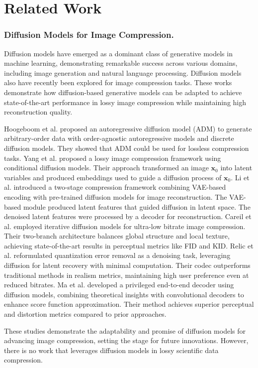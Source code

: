 \section{Related Work}

\subsubsection{Diffusion Models for Image Compression.}

Diffusion models \cite{Sohl2015,Song2019,Ho2020,Song2021scorebased,Nichol2021,Dhariwal2021,yu2024pet} have emerged as a dominant class of generative models in machine learning, demonstrating remarkable success across various domains, including image generation and natural language processing. Diffusion models also have recently been explored for image compression tasks. These works demonstrate how diffusion-based generative models can be adapted to achieve state-of-the-art performance in lossy image compression while maintaining high reconstruction quality.

Hoogeboom et al. proposed an autoregressive diffusion model (ADM) \cite{Hoogeboom2022autoregressive} to generate arbitrary-order data with order-agnostic autoregressive models and discrete diffusion models. They showed that ADM could be used for lossless compression tasks. Yang et al. \cite{Yang2023cd} proposed a lossy image compression framework using conditional diffusion models. Their approach transformed an image $\boldsymbol{x}_0$ into latent variables and produced embeddings used to guide a diffusion process of $\boldsymbol{x}_0$. Li et al. \cite{Li2024extreme} introduced a two-stage compression framework combining VAE-based encoding with pre-trained diffusion models for image reconstruction. The VAE-based module produced latent features that guided diffusion in latent space. The denoised latent features were processed by a decoder for reconstruction. Careil et al. \cite{Careil2024towards} employed iterative diffusion models for ultra-low bitrate image compression. Their two-branch architecture balances global structure and local texture, achieving state-of-the-art results in perceptual metrics like FID and KID. Relic et al. \cite{Relic2024lossy} reformulated quantization error removal as a denoising task, leveraging diffusion for latent recovery with minimal computation. Their codec outperforms traditional methods in realism metrics, maintaining high user preference even at reduced bitrates. Ma et al. \cite{ma2024correcting} developed a privileged end-to-end decoder using diffusion models, combining theoretical insights with convolutional decoders to enhance score function approximation. Their method achieves superior perceptual and distortion metrics compared to prior approaches.

These studies demonstrate the adaptability and promise of diffusion models for advancing image compression, setting the stage for future innovations. However, there is no work that leverages diffusion models in lossy scientific data compression.
